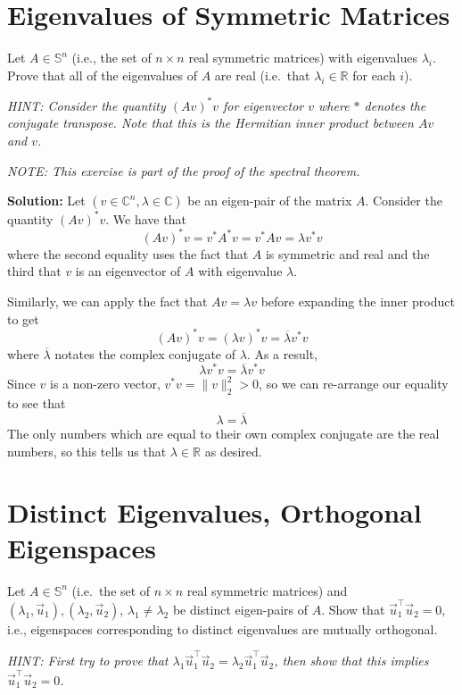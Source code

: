 \documentclass[10pt]{article}
\theoremstyle{definition}
\theoremstyle{plain}
\newcommand{\RR}{\mathbb{R}}
\newcommand{\CC}{\mathbb{C}}
\newcommand{\vv}[1]{\vec{#1}}
\begin{document}
\section{Eigenvalues of Symmetric Matrices}

Let $A \in \mathbb{S}^n$ (i.e., the set of $n \times n$ real symmetric matrices) with eigenvalues $\lambda_i$. Prove that all of the eigenvalues of $A$ are real (i.e.\ that $\lambda_i \in \RR$ for each $i$).

\textit{HINT: Consider the quantity $(Av)^*v$ for eigenvector $v$ where $*$ denotes the conjugate transpose. Note that this is the Hermitian inner product between $Av$ and $v$.}

\textit{NOTE: This exercise is part of the proof of the spectral theorem.}

\textbf{Solution:} Let $(v \in \CC^n, \lambda \in \CC)$ be an eigen-pair of the matrix $A$. Consider the quantity $(Av)^*v$. We have that
\[
(Av)^* v = v^* A^* v = v^* A v = \lambda v^* v
\]
where the second equality uses the fact that $A$ is symmetric and real and the third that $v$ is an eigenvector of $A$ with eigenvalue $\lambda$.

Similarly, we can apply the fact that $Av = \lambda v$ before expanding the inner product to get
\[
(Av)^* v = (\lambda v)^* v = \overline{\lambda} v^* v
\]
where $\overline{\lambda}$ notates the complex conjugate of $\lambda$. As a result,
\[
\lambda v^* v = \overline{\lambda} v^* v
\]
Since $v$ is a non-zero vector, $v^* v = \|v\|_2^2 > 0$, so we can re-arrange our equality to see that
\[
\lambda = \overline{\lambda}
\]
The only numbers which are equal to their own complex conjugate are the real numbers, so this tells us that $\lambda \in \RR$ as desired.

\section{Distinct Eigenvalues, Orthogonal Eigenspaces}

Let $A \in \mathbb{S}^n$ (i.e.\ the set of $n \times n$ real symmetric matrices) and $(\lambda_1, \vv{u}_1), (\lambda_2, \vv{u}_2)$, $\lambda_1 \neq \lambda_2$ be distinct eigen-pairs of $A$. Show that $\vv{u}_1^\top \vv{u}_2 = 0$, i.e., eigenspaces corresponding to distinct eigenvalues are mutually orthogonal.

\textit{HINT: First try to prove that $\lambda_1 \vv{u}_1^\top \vv{u}_2 = \lambda_2 \vv{u}_1^\top \vv{u}_2$, then show that this implies $\vv{u}_1^\top \vv{u}_2 = 0$.}
\end{document}
